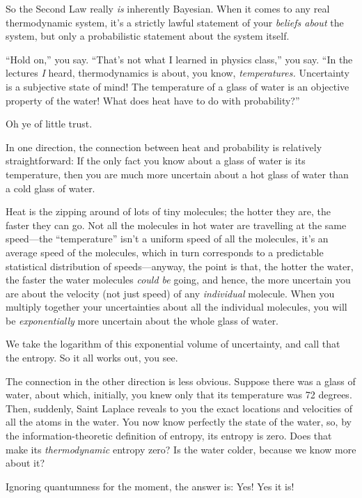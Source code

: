 {
 So the Second Law really \textit{is} inherently Bayesian. When it
comes to any real thermodynamic system, it's a strictly
lawful statement of your \textit{beliefs about} the system, but only a
probabilistic statement about the system itself.}

{
 ``Hold on,'' you say.
``That's not what I learned in physics
class,'' you say. ``In the lectures
\textit{I} heard, thermodynamics is about, you know,
\textit{temperatures.} Uncertainty is a subjective state of mind! The
temperature of a glass of water is an objective property of the water!
What does heat have to do with probability?''}

{
 Oh ye of little trust.}

{
 In one direction, the connection between heat and probability is
relatively straightforward: If the only fact you know about a glass of
water is its temperature, then you are much more uncertain about a hot
glass of water than a cold glass of water.}

{
 Heat is the zipping around of lots of tiny molecules; the hotter
they are, the faster they can go. Not all the molecules in hot water
are travelling at the same speed---the
``temperature''
isn't a uniform speed of all the molecules,
it's an average speed of the molecules, which in turn
corresponds to a predictable statistical distribution of
speeds---anyway, the point is that, the hotter the water, the faster
the water molecules \textit{could be} going, and hence, the more
uncertain you are about the velocity (not just speed) of any
\textit{individual} molecule. When you multiply together your
uncertainties about all the individual molecules, you will be
\textit{exponentially} more uncertain about the whole glass of water.}

{
 We take the logarithm of this exponential volume of uncertainty,
and call that the entropy. So it all works out, you see.}

{
 The connection in the other direction is less obvious. Suppose
there was a glass of water, about which, initially, you knew only that
its temperature was 72 degrees. Then, suddenly, Saint Laplace reveals
to you the exact locations and velocities of all the atoms in the
water. You now know perfectly the state of the water, so, by the
information-theoretic definition of entropy, its entropy is zero. Does
that make its \textit{thermodynamic} entropy zero? Is the water colder,
because we know more about it?}

{
 Ignoring quantumness for the moment, the answer is: Yes! Yes it
is!}

